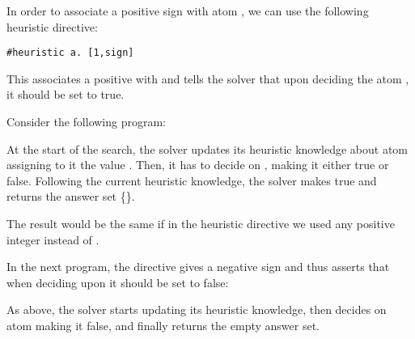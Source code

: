 In order to associate a positive sign with atom , 
we can use the following heuristic directive:
\begin{lstlisting}[numbers=none]
#heuristic a. [1,sign] 
\end{lstlisting}
This associates a positive  with  and 
tells the solver that upon deciding the atom , it should be set to true.
\begin{example}
\label{example:psign}
Consider the following program:

At the start of the search, 
the solver %
updates its heuristic knowledge about atom  assigning to it 
the  value .
Then, it has to decide on , making it either true or false.
Following the current heuristic knowledge, 
the solver makes  true and returns the answer set 
\mbox{\{\}}.
\end{example}

\begin{note}
The result would be the same if in the heuristic directive we used any positive integer instead of .
\end{note}

\begin{example}
\label{example:nsign}
In the next program,
the  directive gives  a negative sign 
and thus asserts that when deciding upon  it should be set to false:

As above,
the solver starts %
updating its heuristic knowledge,
then decides on atom  making it false, and 
finally 
returns the empty answer set.%
\end{example}

